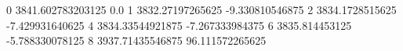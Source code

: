 0 3841.602783203125 0.0
1 3832.27197265625 -9.330810546875
2 3834.1728515625 -7.429931640625
4 3834.33544921875 -7.267333984375
6 3835.814453125 -5.788330078125
8 3937.71435546875 96.111572265625
